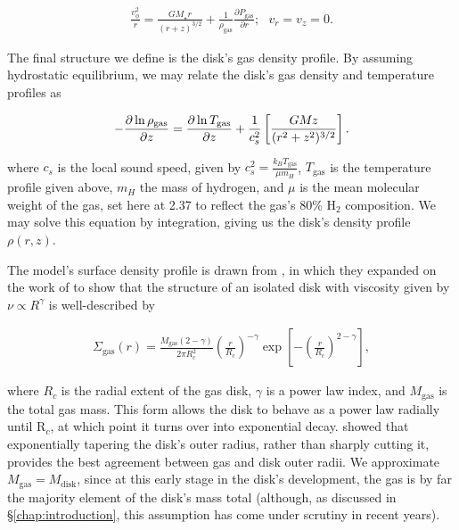 \begin{align}
  \frac{v_\phi^2}{r} = \frac{GM_\star r}{(r + z)^{3/2}} + \frac{1}{\rho_\text{gas}} \frac{\partial P_\text{gas}}{\partial r}; \,\,\,\, v_r = v_z = 0.
\end{align}


The final structure we define is the disk's gas density profile. By assuming hydrostatic equilibrium, we may relate the disk's gas density and temperature profiles as

\begin{align}
  -\frac{\partial \ln \rho_\text{gas}}{\partial z} = \frac{\partial \ln T_\text{gas}}{\partial z} + \frac{1}{c_s^2} \left[\frac{G M_{\*} z}{(r^2 + z^2)^{3/2}} \right].
\end{align}

\noindent where $c_s$ is the local sound speed, given by $c_s^2 = \frac{k_B T_\text{gas}}{\mu m_H}$, $T_\text{gas}$ is the temperature profile given above, $m_H$ the mass of hydrogen, and $\mu$ is the mean molecular weight of the gas, set here at 2.37 to reflect the gas's 80\% H$_2$ composition. We may solve this equation by integration, giving us the disk's density profile $\rho(r, z)$.


The model's surface density profile is drawn from \citet{Hartmann1998}, in which they expanded on the work of \citet{LyndenBell1974} to show that the structure of an isolated disk with viscosity given by $\nu \propto R^\gamma$ is well-described by



\begin{align}
  \Sigma_{\text{gas}}(r) = \frac{M_{\text{gas}} (2 - \gamma)}{2 \pi R_c^2} \left(\frac{r}{R_c} \right)^{-\gamma} \exp \left[-\left(\frac{r}{R_c} \right)^{2-\gamma} \right],
\end{align}



\noindent where $R_c$ is the radial extent of the gas disk, $\gamma$ is a power law index, and $M_\text{gas}$ is the total gas mass. This form allows the disk to behave as a power law radially until R$_c$, at which point it turns over into exponential decay. \citet{Hughes2008} showed that exponentially tapering the disk's outer radius, rather than sharply cutting it, provides the best agreement between gas and disk outer radii. We approximate $M_\text{gas} = M_\text{disk}$, since at this early stage in the disk's development, the gas is by far the majority element of the disk's mass total (although, as discussed in \S\ref{chap:introduction}, this assumption has come under scrutiny in recent years).

